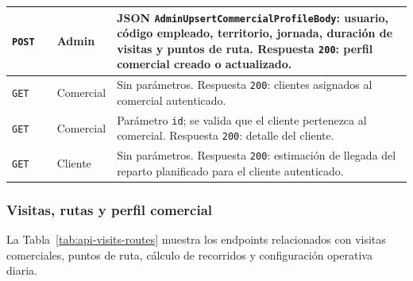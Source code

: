 {\begin{supertabular}{|A{0.10\textwidth}|A{0.27\textwidth}|A{0.15\textwidth}|A{0.38\textwidth}|}
\hline
\texttt{POST} &  & Admin & JSON \texttt{AdminUpsertCommercialProfileBody}: usuario, código empleado, territorio, jornada, duración de visitas y puntos de ruta. Respuesta \texttt{200}: perfil comercial creado o actualizado.\\
\hline
\texttt{GET} &  & Comercial & Sin parámetros. Respuesta \texttt{200}: clientes asignados al comercial autenticado.\\
\hline
\texttt{GET} &  & Comercial & Parámetro \texttt{id}; se valida que el cliente pertenezca al comercial. Respuesta \texttt{200}: detalle del cliente.\\
\hline
\texttt{GET} &  & Cliente & Sin parámetros. Respuesta \texttt{200}: estimación de llegada del reparto planificado para el cliente autenticado.\\
\hline
\end{supertabular}
}

\subsubsection{Visitas, rutas y perfil comercial}

La Tabla~\ref{tab:api-visits-routes} muestra los endpoints relacionados con visitas comerciales, puntos de ruta, cálculo de recorridos y configuración operativa diaria.

